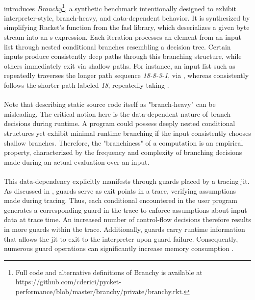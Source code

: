 
			\paragraph{}%
				 introduces \emph{Branchy}\footnote{Full code and alternative definitions of Branchy is available at https://github.com/cderici/pycket-performance/blob/master/branchy/private/branchy.rkt.}, a synthetic benchmark intentionally designed to exhibit interpreter-style, branch-heavy, and data-dependent behavior. It is synthesized by simplifying Racket's  function from the \gls{fasl} library, which deserializes a given byte stream into an s-expression. Each iteration processes an element from an input list through nested conditional branches resembling a decision tree. Certain inputs produce consistently deep paths through this branching structure, while others immediately exit via shallow paths. For instance, an input list such as  repeatedly traverses the longer path sequence \emph{18-8-3-1}, via , whereas  consistently follows the shorter path labeled \emph{18}, repeatedly taking .

			\paragraph{}%
				Note that describing static source code itself as "branch-heavy" can be misleading. The critical notion here is the data-dependent nature of branch decisions during runtime. A program could possess deeply nested conditional structures yet exhibit minimal runtime branching if the input consistently chooses shallow branches. Therefore, the "branchiness" of a computation is an empirical property, characterized by the frequency and complexity of branching decisions made during an actual evaluation over an input.

			\paragraph{}%
				This data-dependency explicitly manifests through guards placed by a tracing \gls{jit}. As discussed in , guards serve as exit points in a trace, verifying assumptions made during tracing. Thus, each conditional encountered in the user program generates a corresponding guard in the trace to enforce assumptions about input data at trace time. An increased number of control-flow decisions therefore results in more guards within the trace. Additionally, guards carry runtime information that allows the \gls{jit} to exit to the interpreter upon guard failure. Consequently, numerous guard operations can significantly increase memory consumption \cite{schneiderEfficientHandlingGuards2012}.

